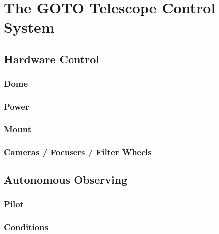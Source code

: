 \chapter{The GOTO Telescope Control System}
\label{chap:gtecs}
\chaptoc{}
\newpage

\section{Hardware Control}
\label{sec:daemons}

\lipsum{}

\subsection{Dome}
\label{sec:daemons-dome}

\lipsum{}

\subsection{Power}
\label{sec:daemons-power}

\lipsum{}

\subsection{Mount}
\label{sec:daemons-mount}

\lipsum{}

\subsection{Cameras / Focusers / Filter Wheels}
\label{sec:daemons-fli}

\lipsum{}


\section{Autonomous Observing}
\label{sec:autonomous}

\lipsum{}

\subsection{Pilot}
\label{sec:autonomous-pilot}

\lipsum{}

\subsection{Conditions}
\label{sec:autonomous-conditions}


